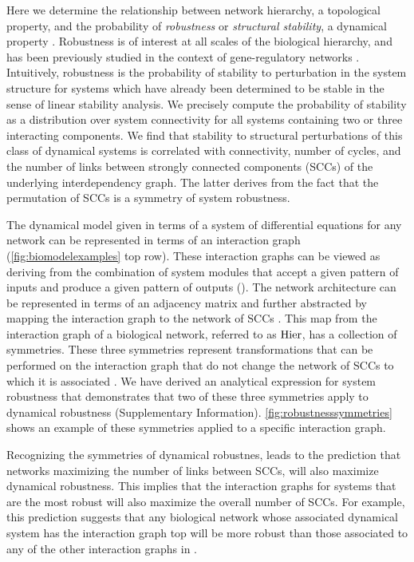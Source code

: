 Here we determine the relationship between network hierarchy, a topological property, and the probability of \emph{robustness} or \emph{structural stability}, a dynamical property \cite{Smale1967}. Robustness is of interest at all scales of the biological hierarchy, and has been previously studied in the context of gene-regulatory networks \cite{WADDINGTON1942a,VanNimwegen1999,Siegal2002,Ciliberti2007b,Ciliberti2007,Wagner2013}. Intuitively, robustness is the probability of stability to perturbation in the system structure for systems which have already been determined to be stable in the sense of linear stability analysis. We precisely compute the probability of stability as a distribution over system connectivity for all systems containing two or three interacting components. We find that stability to structural perturbations of this class of dynamical systems is correlated with connectivity, number of cycles, and the number of links between strongly connected components (SCCs) of the underlying interdependency graph. The latter derives from the fact that the permutation of SCCs is a symmetry of system robustness.

The dynamical model given in terms of a system of differential equations for any network can be represented in terms of an interaction graph (\ref{fig:biomodelexamples} top row). These interaction graphs can be viewed as deriving from the combination of system modules that accept a given pattern of inputs and produce a given pattern of outputs (). The network architecture can be represented in terms of an adjacency matrix and further abstracted by mapping the interaction graph to the network of SCCs . This map from the interaction graph of a biological network, referred to as $\mathrm{Hier}$, has a collection of symmetries. These three symmetries represent transformations that can be performed on the interaction graph that do not change the network of SCCs to which it is associated . We have derived an analytical expression for system robustness that demonstrates that two of these three symmetries apply to dynamical robustness (Supplementary Information). \ref{fig:robustnesssymmetries} shows an example of these symmetries applied to a specific interaction graph.

Recognizing the symmetries of dynamical robustnes, leads to the prediction that networks maximizing the number of links between SCCs, will also maximize dynamical robustness. This implies that the interaction graphs for systems that are the most robust will also maximize the overall number of SCCs. For example, this prediction suggests that any biological network whose associated dynamical system has the interaction graph  top will be more robust than those associated to any of the other interaction graphs in .

